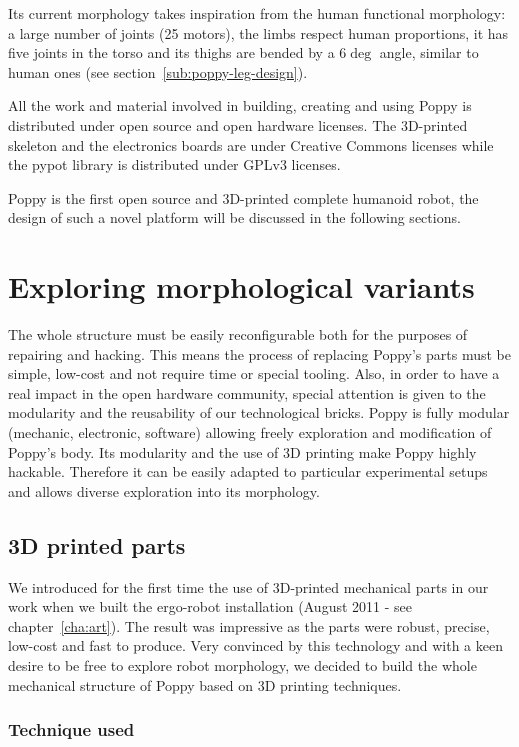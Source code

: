 Its current morphology takes inspiration from the human functional morphology: a large number of joints (25 motors), the limbs respect human proportions, it has five joints in the torso and its thighs are bended by a $6\deg$ angle, similar to human ones (see section~\ref{sub:poppy-leg-design}).

All the work and material involved in building, creating and using Poppy is distributed under open source and open hardware licenses. The 3D-printed skeleton and the electronics boards are under Creative Commons licenses while the pypot library is distributed under GPLv3 licenses.

Poppy is the first open source and 3D-printed complete humanoid robot, the design of such a novel platform will be discussed in the following sections.


\section{Exploring morphological variants} %
\label{sec:poppy-modularity}

The whole structure must be easily reconfigurable both for the purposes of repairing and hacking. This means the process of replacing Poppy's parts must be simple, low-cost and not require time or special tooling. Also, in order to have a real impact in the open hardware community, special attention is given to the modularity and the reusability of our technological bricks.
Poppy is fully modular (mechanic, electronic, software) allowing freely exploration and modification of Poppy's body.
Its modularity and the use of 3D printing make Poppy highly hackable. Therefore it can be easily adapted to particular experimental setups and allows diverse exploration into its morphology.


\subsection{3D printed parts} %

We introduced for the first time the use of 3D-printed mechanical parts in our work when we built the ergo-robot installation (August 2011 - see chapter~\ref{cha:art}). The result was impressive as the parts were robust, precise, low-cost and fast to produce. Very convinced by this technology and with a keen desire to be free to explore robot morphology, we decided to build the whole mechanical structure of Poppy based on 3D printing techniques.

\subsubsection{Technique used} %


